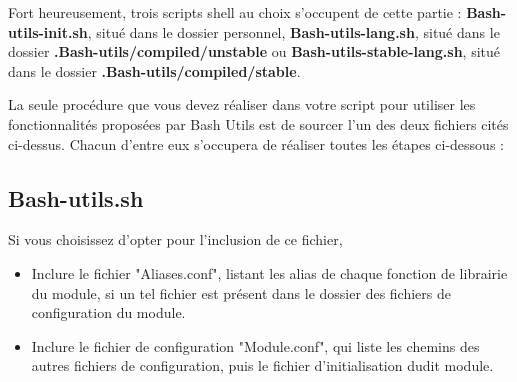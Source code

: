 \documentclass[a4paper,10pt]{article}
\begin{document}
\begin{justify}
    Fort heureusement, trois scripts shell au choix s'occupent de cette partie : \textbf{\color{lime}Bash-utils-init.sh}, situé dans le dossier personnel, \textbf{\color{lime}Bash-utils-lang.sh}, situé dans le dossier \textbf{\color{lime}.Bash-utils/compiled/unstable} ou \textbf{\color{lime}Bash-utils-stable-lang.sh}, situé dans le dossier \textbf{\color{lime}.Bash-utils/compiled/stable}.
\end{justify}

\begin{justify}
    La seule procédure que vous devez réaliser dans votre script pour utiliser les fonctionnalités proposées par Bash Utils est de sourcer l'un des deux fichiers cités ci-dessus. Chacun d'entre eux s'occupera de réaliser toutes les étapes ci-dessous :
\end{justify}




\color{green}
\subsection{\color{lime}Bash-utils.sh}\color{white}

\begin{justify}
    Si vous choisissez d'opter pour l'inclusion de ce fichier,
\end{justify}

\begin{justify}
    \begin{itemize}
        \item Inclure le fichier "Aliases.conf", listant les alias de chaque fonction de librairie du module, si un tel fichier est présent dans le dossier des fichiers de configuration du module.
    \end{itemize}
\end{justify}

\begin{justify}
    \begin{itemize}
        \item Inclure le fichier de configuration "Module.conf", qui liste les chemins des autres fichiers de configuration, puis le fichier d'initialisation dudit module.
    \end{itemize}

\end{justify}
\end{document}
